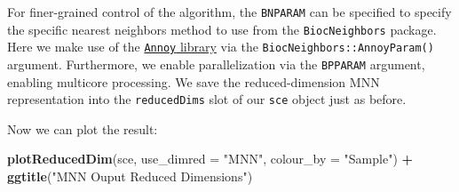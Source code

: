 \documentclass[]{book}
\newenvironment{Shaded}{\begin{snugshade}}{\end{snugshade}}
\newcommand{\CommentTok}[1]{\textcolor[rgb]{0.56,0.35,0.01}{\textit{#1}}}
\newcommand{\DataTypeTok}[1]{\textcolor[rgb]{0.13,0.29,0.53}{#1}}
\newcommand{\DecValTok}[1]{\textcolor[rgb]{0.00,0.00,0.81}{#1}}
\newcommand{\KeywordTok}[1]{\textcolor[rgb]{0.13,0.29,0.53}{\textbf{#1}}}
\newcommand{\NormalTok}[1]{#1}
\newcommand{\OperatorTok}[1]{\textcolor[rgb]{0.81,0.36,0.00}{\textbf{#1}}}
\newcommand{\OtherTok}[1]{\textcolor[rgb]{0.56,0.35,0.01}{#1}}
\newcommand{\StringTok}[1]{\textcolor[rgb]{0.31,0.60,0.02}{#1}}
\begin{document}
For finer-grained control of the algorithm, the \texttt{BNPARAM} can be specified to specify the specific nearest neighbors method to use from the \texttt{BiocNeighbors} package. Here we make use of the \href{https://github.com/spotify/annoy}{\texttt{Annoy} library} via the \texttt{BiocNeighbors::AnnoyParam()} argument. Furthermore, we enable parallelization via the \texttt{BPPARAM} argument, enabling multicore processing. We save the reduced-dimension MNN representation into the \texttt{reducedDims} slot of our \texttt{sce} object just as before.

\begin{Shaded}
\end{Shaded}

Now we can plot the result:

\begin{Shaded}
\begin{Highlighting}[]
\KeywordTok{plotReducedDim}\NormalTok{(sce, }\DataTypeTok{use_dimred =} \StringTok{"MNN"}\NormalTok{,}
                    \DataTypeTok{colour_by =} \StringTok{"Sample"}\NormalTok{) }\OperatorTok{+}\StringTok{ }
\StringTok{    }\KeywordTok{ggtitle}\NormalTok{(}\StringTok{"MNN Ouput Reduced Dimensions"}\NormalTok{)}
\end{Highlighting}
\end{Shaded}
\end{document}
